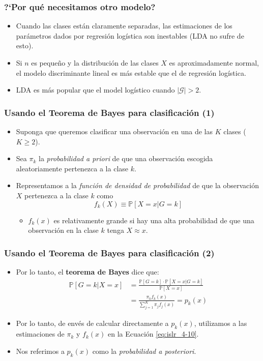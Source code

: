 \documentclass[usenames,dvipsnames]{beamer} %
\newcommand\defi[1]{\textcolor{NavyBlue}{\textit{#1}}}
\begin{document}
\begin{frame}\frametitle{?`Por qu\'e necesitamos otro modelo?}
\begin{itemize}
	\item Cuando las clases est\'an claramente separadas, las estimaciones de los par\'ametros dados por regresi\'on log\'istica son inestables (LDA no sufre de esto).
	\item Si $n$ es peque\~no y la distribuci\'on de las clases $X$ es aproximadamente normal, el modelo discriminante lineal es m\'as estable que el de regresi\'on log\'istica.
	\item LDA es m\'as popular que el model log\'istico cuando $|\mathcal{G}|>2$.
\end{itemize}
\end{frame}

\begin{frame}\frametitle{Usando el Teorema de Bayes para clasificaci\'on (1)}
\begin{itemize}
	\item Suponga que queremos clasificar una observaci\'on en una de las $K$ clases ($K\geq2$).
	\item Sea $\pi_k$ la \defi{probabilidad a priori} de que una observaci\'on escogida aleatoriamente pertenezca a la clase $k$.
	\item Representamos a la \defi{funci\'on de densidad de probabilidad} de que la observaci\'on $X$ pertenezca a la clase $k$ como
	\[ f_{k}(X)\equiv\mathbb{P}[X=x|G=k] \]
	\begin{itemize}
		\item $f_k(x)$ es relativamente grande si hay una alta probabilidad de que una observaci\'on en la clase $k$ tenga $X\approx x$.
	\end{itemize}
\end{itemize}
\end{frame}

\begin{frame}\frametitle{Usando el Teorema de Bayes para clasificaci\'on (2)}
\begin{itemize}
	\item Por lo tanto, el \textbf{teorema de Bayes} dice que:
	\begin{equation}
	\begin{aligned}\label{eq:islr_4-10}
	\mathbb{P}[G=k|X=x]&=\frac{\mathbb{P}[G=k]\cdot\mathbb{P}[X=x|G=k]}{\mathbb{P}[X=x]}\\
	&=\frac{\pi_k f_k(x)}{\sum_{j=1}^{K}\pi_j f_{j}(x)}=p_k(x)
	\end{aligned}
	\end{equation}
	\item Por lo tanto, de env\'es de calcular directamente a $p_k(x)$, utilizamos a las estimaciones de $\pi_k$ y $f_k(x)$ en la Ecuaci\'on \ref{eq:islr_4-10}.
	\item Nos referimos a $p_k(x)$ como la \defi{probabilidad a posteriori}.
\end{itemize}
\end{frame}
\end{document}
